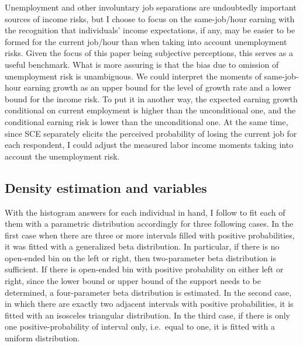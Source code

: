 Unemployment and other involuntary job separations are undoubtedly
important sources of income risks, but I choose to focus on the
same-job/hour earning with the recognition that individuals' income
expectations, if any, may be easier to be formed for the current
job/hour than when taking into account unemployment risks. Given the
focus of this paper being subjective perceptions, this serves as a
useful benchmark. What is more assuring is that the bias due to omission
of unemployment risk is unambiguous. We could interpret the moments of
same-job-hour earning growth as an upper bound for the level of growth
rate and a lower bound for the income risk. To put it in another way,
the expected earning growth conditional on current employment is higher
than the unconditional one, and the conditional earning risk is lower
than the unconditional one. At the same time, since SCE separately
elicits the perceived probability of losing the current job for each
respondent, I could adjust the measured labor income moments taking into
account the unemployment risk.

\hypertarget{density-estimation-and-variables}{%
\subsection{Density estimation and
variables}\label{density-estimation-and-variables}}

With the histogram answers for each individual in hand, I follow
\cite{engelberg_comparing_2009} to fit each of them with a parametric
distribution accordingly for three following cases. In the first case
when there are three or more intervals filled with positive
probabilities, it was fitted with a generalized beta distribution. In
particular, if there is no open-ended bin on the left or right, then
two-parameter beta distribution is sufficient. If there is
open-ended bin with positive probability on either left or right, since the lower bound or upper
bound of the support needs to be determined, a four-parameter beta
distribution is estimated. In the second case, in which there are
exactly two adjacent intervals with positive probabilities, it is fitted
with an isosceles triangular distribution. In the third case, if there
is only one positive-probability of interval only, i.e.~equal to one, it
is fitted with a uniform distribution.

